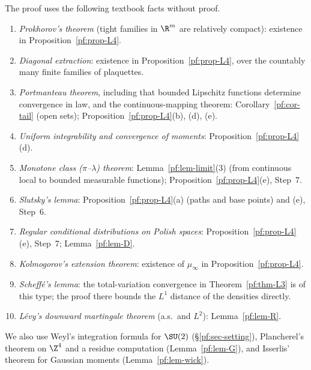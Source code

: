The proof uses the following textbook facts without proof.
\begin{enumerate}
\item \emph{Prokhorov's theorem} (tight families in $\R^m$ are relatively compact): existence in Proposition~\ref{pf:prop-L4}.
\item \emph{Diagonal extraction}: existence in Proposition~\ref{pf:prop-L4}, over the countably many finite families of plaquettes.
\item \emph{Portmanteau theorem}, including that bounded Lipschitz functions determine convergence in law, and the continuous-mapping theorem: Corollary~\ref{pf:cor-tail} (open sets); Proposition~\ref{pf:prop-L4}(b), (d), (e).
\item \emph{Uniform integrability and convergence of moments}: Proposition~\ref{pf:prop-L4}(d).
\item \emph{Monotone class ($\pi$--$\lambda$) theorem}: Lemma~\ref{pf:lem-limit}(3) (from continuous local to bounded measurable functions); Proposition~\ref{pf:prop-L4}(e), Step~7.
\item \emph{Slutsky's lemma}: Proposition~\ref{pf:prop-L4}(a) (paths and base points) and (e), Step~6.
\item \emph{Regular conditional distributions on Polish spaces}: Proposition~\ref{pf:prop-L4}(e), Step~7; Lemma~\ref{pf:lem-D}.
\item \emph{Kolmogorov's extension theorem}: existence of $\mu_\infty$ in Proposition~\ref{pf:prop-L4}.
\item \emph{Scheff\'e's lemma}: the total-variation convergence in Theorem~\ref{pf:thm-L3} is of this type; the proof there bounds the $L^1$ distance of the densities directly.
\item \emph{L\'evy's downward martingale theorem} (a.s.\ and $L^2$): Lemma~\ref{pf:lem-R}.
\end{enumerate}
We also use Weyl's integration formula for $\SU(2)$ (\S\ref{pf:sec-setting}), Plancherel's theorem on $\Z^4$ and a residue computation (Lemma~\ref{pf:lem-G}), and Isserlis' theorem for Gaussian moments (Lemma~\ref{pf:lem-wick}).

